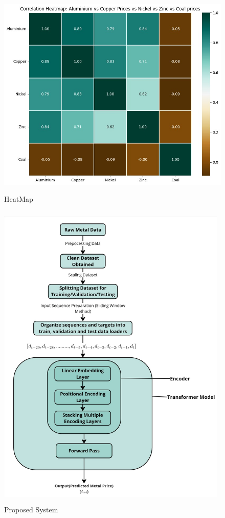 \documentclass[preprint,12pt]{elsarticle}
\begin{document}
\begin{center}
	\begin{figure}[!htbp]
		\centering
		\includegraphics[width=12cm, height=10cm]{heatmap.jpeg}
		\caption{HeatMap}
		\label{fighm}
	\end{figure}
\end{center}

\begin{center}
	\begin{figure}[!htbp]
		\centering
		\includegraphics[width=11cm, height=15cm]{Transformer.jpg}
		\caption{Proposed System}
		\label{figpp}
	\end{figure}
\end{center}
\end{document}
